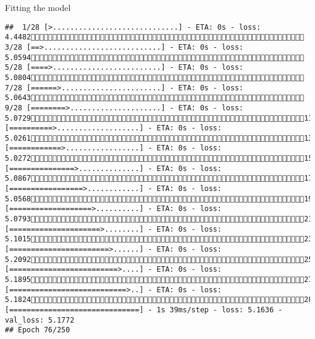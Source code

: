 \documentclass[
  ignorenonframetext,
]{beamer}
\begin{document}
\begin{frame}[fragile]{Fitting the model}
\begin{verbatim}
##  1/28 [>.............................] - ETA: 0s - loss: 4.4482 3/28 [==>...........................] - ETA: 0s - loss: 5.0594 5/28 [====>.........................] - ETA: 0s - loss: 5.0804 7/28 [======>.......................] - ETA: 0s - loss: 5.0643 9/28 [========>.....................] - ETA: 0s - loss: 5.072911/28 [==========>...................] - ETA: 0s - loss: 5.026113/28 [============>.................] - ETA: 0s - loss: 5.027215/28 [===============>..............] - ETA: 0s - loss: 5.086717/28 [=================>............] - ETA: 0s - loss: 5.056819/28 [===================>..........] - ETA: 0s - loss: 5.079321/28 [=====================>........] - ETA: 0s - loss: 5.101523/28 [=======================>......] - ETA: 0s - loss: 5.209225/28 [=========================>....] - ETA: 0s - loss: 5.189527/28 [===========================>..] - ETA: 0s - loss: 5.182428/28 [==============================] - 1s 39ms/step - loss: 5.1636 - val_loss: 5.1772
## Epoch 76/250

\end{verbatim}
\end{frame}
\end{document}
